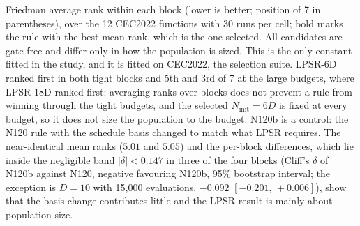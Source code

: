 \begin{table}[htbp]
\centering
\caption{Choosing the population rule on CEC2022, the selection suite.}
\label{tab:poprule}
\begin{flushleft}\footnotesize
Friedman average rank within each block (lower is better; position of 7 in parentheses), over the 12 CEC2022 functions with 30 runs per cell; bold marks the rule with the best mean rank, which is the one selected. All candidates are gate-free and differ only in how the population is sized. This is the only constant fitted in the study, and it is fitted on CEC2022, the selection suite. LPSR-6D ranked first in both tight blocks and 5th and 3rd of 7 at the large budgets, where LPSR-18D ranked first: averaging ranks over blocks does not prevent a rule from winning through the tight budgets, and the selected $N_{\text{init}}=6D$ is fixed at every budget, so it does not size the population to the budget. N120b is a control: the N120 rule with the schedule basis changed to match what LPSR requires. The near-identical mean ranks ($5.01$ and $5.05$) and the per-block differences, which lie inside the negligible band $|\delta|<0.147$ in three of the four blocks (Cliff's $\delta$ of N120b against N120, negative favouring N120b, 95\% bootstrap interval; the exception is $D{=}10$ with 15{,}000 evaluations, $-0.092$ $[-0.201,\,+0.006]$), show that the basis change contributes little and the LPSR result is mainly about population size.
\end{flushleft}
\end{table}
